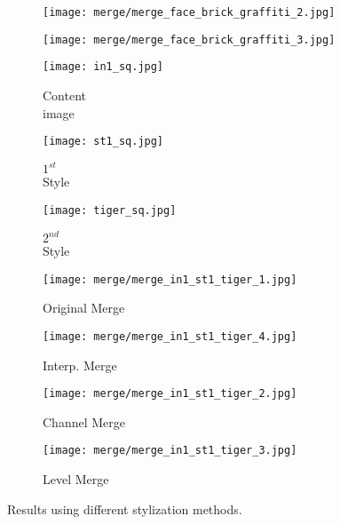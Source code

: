 \begin{figure}[H]
\begin{subfigure}[b]{0.13\linewidth}
	\end{subfigure}
	\begin{subfigure}[b]{0.13\linewidth}
		\texttt{[image: merge/merge\_face\_brick\_graffiti\_2.jpg]} %
	\end{subfigure}
	\begin{subfigure}[b]{0.13\linewidth}
		\texttt{[image: merge/merge\_face\_brick\_graffiti\_3.jpg]} %
	\end{subfigure}
	\centering
	\begin{subfigure}[b]{0.13\linewidth}
		\texttt{[image: in1\_sq.jpg]} %
		\caption{Content \\ image}
	\end{subfigure}
	\begin{subfigure}[b]{0.13\linewidth}
		\texttt{[image: st1\_sq.jpg]} %
		\caption{$1^{st}$ \\ Style}
	\end{subfigure}
	\begin{subfigure}[b]{0.13\linewidth}
		\texttt{[image: tiger\_sq.jpg]} %
		\caption{$2^{nd}$ \\ Style}
	\end{subfigure}
	\begin{subfigure}[b]{0.13\linewidth}
		\texttt{[image: merge/merge\_in1\_st1\_tiger\_1.jpg]} %
		\caption{Original Merge}
	\end{subfigure}
	\begin{subfigure}[b]{0.13\linewidth}
		\texttt{[image: merge/merge\_in1\_st1\_tiger\_4.jpg]} %
		\caption{Interp. Merge}
	\end{subfigure}
	\begin{subfigure}[b]{0.13\linewidth}
		\texttt{[image: merge/merge\_in1\_st1\_tiger\_2.jpg]} %
		\caption{Channel Merge}
	\end{subfigure}
	\begin{subfigure}[b]{0.13\linewidth}
		\texttt{[image: merge/merge\_in1\_st1\_tiger\_3.jpg]} %
		\caption{Level Merge}
	\end{subfigure}
		\caption{Results using different stylization methods.}
		\label{fig:Merge}
\end{figure}


